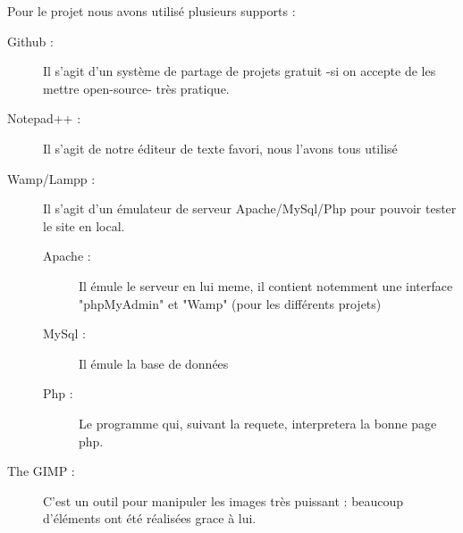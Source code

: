 Pour le projet nous avons utilisé plusieurs supports :\\
\begin{description}
	\item[Github :] Il s'agit d'un système de partage de projets gratuit -si on accepte de les mettre open-source- très pratique.
	\item[Notepad++ :] Il s'agit de notre éditeur de texte favori, nous l'avons tous utilisé
	\item[Wamp/Lampp :] Il s'agit d'un émulateur de serveur Apache/MySql/Php pour pouvoir tester le site en local.
		\begin{description}
			\item[Apache :] Il émule le serveur en lui meme, il contient notemment une interface "phpMyAdmin" et "Wamp" (pour les différents projets)
			\item[MySql :] Il émule la base de données
			\item[Php :] Le programme qui, suivant la requete, interpretera la bonne page php.
		\end{description}
	\item[The GIMP :] C'est un outil pour manipuler les images très puissant : beaucoup d'éléments ont été réalisées grace à lui.
\end{description}